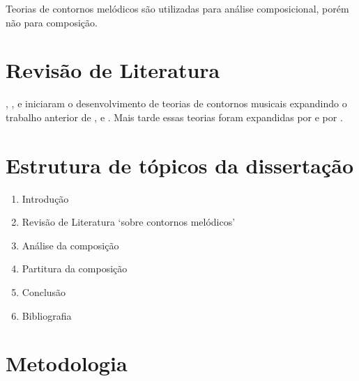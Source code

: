 \documentclass{article}
\begin{document}

Teorias de contornos melódicos são utilizadas para análise
composicional, porém não para composição.

\section{Revisão de Literatura}
\label{sec:revis-de-liter}

\cite{friedmann85:_method_discus_contour},
\cite{morris1987cpc}, \cite{marvin87:_relat_music_contour}
e \cite{polansky92:_possib_impos_melod} iniciaram o
desenvolvimento de teorias de contornos musicais expandindo o trabalho
anterior de \cite{seeger1960mml},
\cite{kolinkski65:_struc_melod_movem} e
\cite{adams1976mct}. Mais tarde essas teorias foram expandidas
por \cite{quinn97:_fuzzy_exten_theor_contour} e por
\cite{beard2003cmm}.


\section{Estrutura de tópicos da dissertação}
\label{sec:estrutura-de-topicos}

\begin{enumerate}
\item Introdução
\item Revisão de Literatura `sobre contornos melódicos'
\item Análise da composição
\item Partitura da composição
\item Conclusão
\item Bibliografia
\end{enumerate}

\section{Metodologia}
\label{sec:metodologia}
\end{document}
